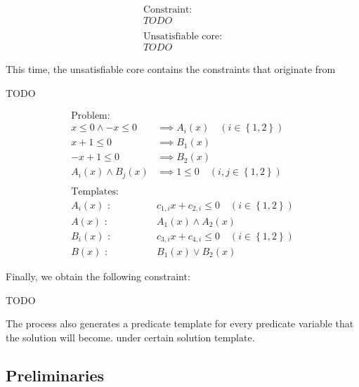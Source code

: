 \documentclass[a4paper,12pt]{article}
\begin{document}
\begin{align*}
\text{Constraint:} \\
TODO \\
\\
\text{Unsatisfiable core:} \\
TODO
\end{align*}

This time, the unsatisfiable core contains the constraints that
originate from

TODO

\begin{align*}
\text{Problem:} \\
x \leq 0 \wedge -x \leq 0 & \implies A_i(x) \quad (i \in \left\lbrace 1,2 \right\rbrace ) \\
x+1 \leq 0 & \implies B_1(x) \\
-x+1 \leq 0 & \implies B_2(x) \\
A_i(x) \wedge B_j(x) & \implies 1 \leq 0 \quad (i,j \in \left\lbrace 1,2 \right\rbrace ) \\
\\
\text{Templates:} \\
A_i(x) \text{ : } & c_{1,i} x + c_{2,i} \leq 0 \quad (i \in \left\lbrace 1,2 \right\rbrace ) \\
A(x) \text{ : } & A_1(x) \wedge A_2(x) \\
B_i(x) \text{ : } & c_{3,i} x + c_{4,i} \leq 0 \quad (i \in \left\lbrace 1,2 \right\rbrace ) \\
B(x) \text{ : } & B_1(x) \vee B_2(x)
\end{align*}

Finally, we obtain the following constraint:

TODO


The process also generates a predicate template for every predicate
variable that the solution will become.  under certain solution
template.

\subsection{Preliminaries}
\end{document}
